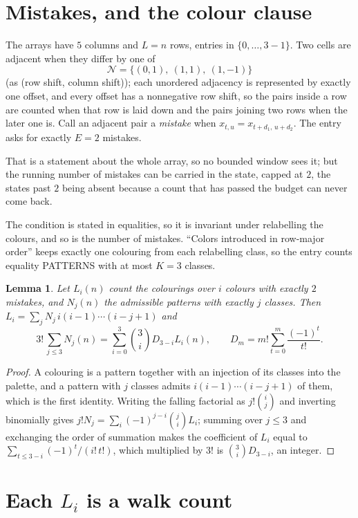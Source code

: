 \documentclass[11pt,a4paper]{article}
\theoremstyle{plain}
\newtheorem{lemma}[theorem]{Lemma}
\theoremstyle{definition}
\begin{document}
\section{Mistakes, and the colour clause}

The arrays have $5$ columns and $L=n$ rows, entries in $\{0,\dots,3-1\}$.
Two cells are adjacent when they differ by one of
\[
\mathcal N=\{(0,1),\ (1,1),\ (1,-1)\}
\]
(as (row shift, column shift)); each unordered adjacency is represented by exactly one
offset, and every offset has a nonnegative row shift, so the pairs inside a row are
counted when that row is laid down and the pairs joining two rows when the later one
is. Call an adjacent pair a \emph{mistake} when $x_{t,u}=x_{t+d_1,\,u+d_2}$. The entry asks for exactly
$E=2$ mistakes.

That is a statement about the whole array, so no bounded window sees it; but the running
number of mistakes can be carried in the state, capped at $2$, the states past $2$ being
absent because a count that has passed the budget can never come back.

The condition is stated in equalities, so it is invariant under relabelling the colours, and
so is the number of mistakes. ``Colors introduced in row-major order'' keeps exactly one
colouring from each relabelling class, so the entry counts equality PATTERNS with at most
$K=3$ classes.

\begin{lemma}\label{lem:inv}
Let $L_i(n)$ count the colourings over $i$ colours with exactly $2$ mistakes, and $N_j(n)$
the admissible patterns with exactly $j$ classes. Then
$L_i=\sum_j N_j\,i(i-1)\cdots(i-j+1)$ and
\[
3!\,\sum_{j\le3}N_j(n)=\sum_{i=0}^{3}\binom{3}{i}D_{3-i}L_i(n),
\qquad D_m=m!\sum_{t=0}^{m}\frac{(-1)^t}{t!} .
\]
\end{lemma}

\begin{proof}
A colouring is a pattern together with an injection of its classes into the palette, and a
pattern with $j$ classes admits $i(i-1)\cdots(i-j+1)$ of them, which is the first identity.
Writing the falling factorial as $j!\binom{i}{j}$ and inverting binomially gives
$j!N_j=\sum_i(-1)^{j-i}\binom{j}{i}L_i$; summing over $j\le3$ and exchanging the order
of summation makes the coefficient of $L_i$ equal to $\sum_{t\le3-i}(-1)^t/(i!\,t!)$,
which multiplied by $3!$ is $\binom{3}{i}D_{3-i}$, an integer.
\end{proof}

\section{Each $L_i$ is a walk count}
\end{document}
